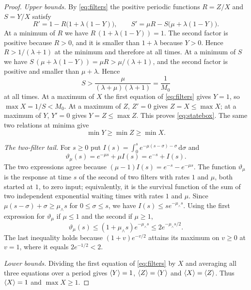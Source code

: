 \begin{proof}
\emph{Upper bounds.} By \eqref{eq:filters} the positive periodic functions $R=Z/X$ and $S=Y/X$ satisfy
\[
R'=1-R\bigl(1+\lambda(1-Y)\bigr),\qquad
S'=\mu R-S\bigl(\mu+\lambda(1-Y)\bigr).
\]
At a minimum of $R$ we have $R\,(1+\lambda(1-Y))=1$. The second factor is positive because $R>0$, and it is smaller than $1+\lambda$ because $Y>0$. Hence $R>1/(\lambda+1)$ at the minimum and therefore at all times. At a minimum of $S$ we have $S\,(\mu+\lambda(1-Y))=\mu R>\mu/(\lambda+1)$, and the second factor is positive and smaller than $\mu+\lambda$. Hence
\[
S>\frac{\mu}{(\lambda+\mu)(\lambda+1)}=\frac1{M_0}
\]
at all times. At a maximum of $X$ the first equation of \eqref{eq:filters} gives $Y=1$, so $\max X=1/S<M_0$. At a maximum of $Z$, $Z'=0$ gives $Z=X\le\max X$; at a maximum of $Y$, $Y'=0$ gives $Y=Z\le\max Z$. This proves \eqref{eq:statebox}. The same two relations at minima give
\begin{equation}\label{cpt:eq:filtermin}
\min Y\ge\min Z\ge\min X.
\end{equation}

\emph{The two-filter tail.} For $s\ge0$ put $I(s)=\int_0^s e^{-\mu(s-\sigma)-\sigma}\,\mathrm d\sigma$ and
\[
\vartheta_\mu(s)=e^{-\mu s}+\mu I(s)=e^{-s}+I(s).
\]
The two expressions agree because $(\mu-1)I(s)=e^{-s}-e^{-\mu s}$. The function $\vartheta_\mu$ is the response at time $s$ of the second of two filters with rates $1$ and $\mu$, both started at $1$, to zero input; equivalently, it is the survival function of the sum of two independent exponential waiting times with rates $1$ and $\mu$. Since $\mu(s-\sigma)+\sigma\ge\mu_\wedge s$ for $0\le\sigma\le s$, we have $I(s)\le se^{-\mu_\wedge s}$. Using the first expression for $\vartheta_\mu$ if $\mu\le1$ and the second if $\mu\ge1$,
\begin{equation}\label{cpt:eq:tail}
\vartheta_\mu(s)\le(1+\mu_\wedge s)e^{-\mu_\wedge s}\le2e^{-\mu_\wedge s/2}.
\end{equation}
The last inequality holds because $(1+v)e^{-v/2}$ attains its maximum on $v\ge0$ at $v=1$, where it equals $2e^{-1/2}<2$.

\emph{Lower bounds.} Dividing the first equation of \eqref{eq:filters} by $X$ and averaging all three equations over a period gives $\left\langle Y\right\rangle=1$, $\left\langle Z\right\rangle=\left\langle Y\right\rangle$ and $\left\langle X\right\rangle=\left\langle Z\right\rangle$. Thus $\left\langle X\right\rangle=1$ and $\max X\ge1$.


\end{proof}
